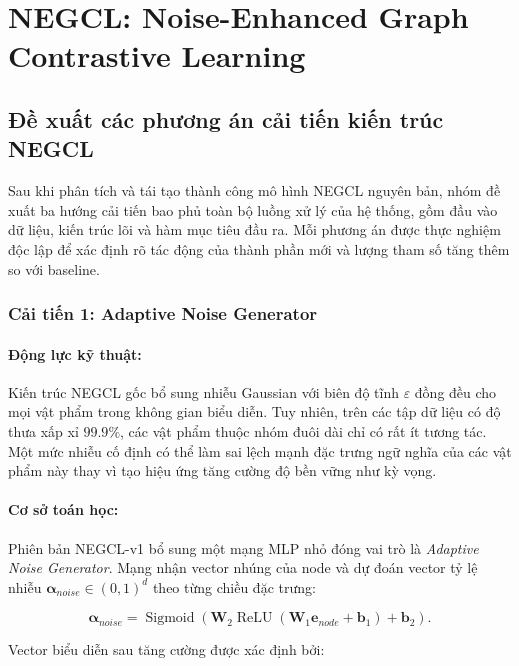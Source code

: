 \section{NEGCL: Noise-Enhanced Graph Contrastive Learning}

\subsection{Đề xuất các phương án cải tiến kiến trúc NEGCL}

Sau khi phân tích và tái tạo thành công mô hình NEGCL nguyên bản, nhóm đề xuất ba hướng cải tiến bao phủ toàn bộ luồng xử lý của hệ thống, gồm đầu vào dữ liệu, kiến trúc lõi và hàm mục tiêu đầu ra. Mỗi phương án được thực nghiệm độc lập để xác định rõ tác động của thành phần mới và lượng tham số tăng thêm so với baseline.

\subsubsection{Cải tiến 1: Adaptive Noise Generator}

\paragraph{Động lực kỹ thuật:}
Kiến trúc NEGCL gốc bổ sung nhiễu Gaussian với biên độ tĩnh $\varepsilon$ đồng đều cho mọi vật phẩm trong không gian biểu diễn. Tuy nhiên, trên các tập dữ liệu có độ thưa xấp xỉ $99.9\%$, các vật phẩm thuộc nhóm đuôi dài chỉ có rất ít tương tác. Một mức nhiễu cố định có thể làm sai lệch mạnh đặc trưng ngữ nghĩa của các vật phẩm này thay vì tạo hiệu ứng tăng cường độ bền vững như kỳ vọng.

\paragraph{Cơ sở toán học:}
Phiên bản NEGCL-v1 bổ sung một mạng MLP nhỏ đóng vai trò là \textit{Adaptive Noise Generator}. Mạng nhận vector nhúng của node và dự đoán vector tỷ lệ nhiễu $\boldsymbol{\alpha}_{noise}\in(0,1)^d$ theo từng chiều đặc trưng:

\begin{equation}
\boldsymbol{\alpha}_{noise}
= \operatorname{Sigmoid}\!\left(
\mathbf{W}_2\operatorname{ReLU}(\mathbf{W}_1\mathbf{e}_{node}+\mathbf{b}_1)+\mathbf{b}_2
\right).
\end{equation}

Vector biểu diễn sau tăng cường được xác định bởi:

